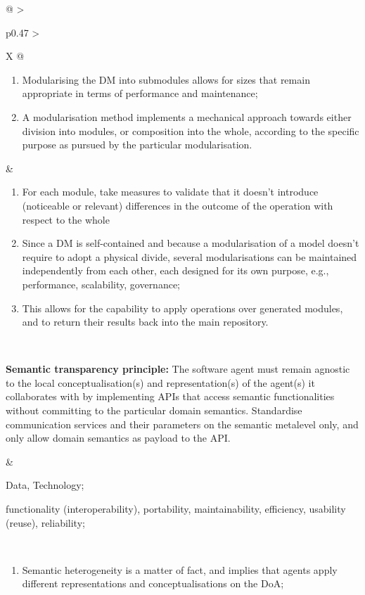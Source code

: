 \begin{xltabular}[l]{\linewidth}{@{} >{\small\raggedright\arraybackslash}p{0.47\linewidth} >{\small\raggedright\arraybackslash}X @{}}
\begin{enumerate}[left=6pt, nosep]
  \item Modularising the DM into submodules allows for sizes that remain appropriate in terms of performance and maintenance;
  \item A modularisation method implements a mechanical approach towards either division into modules, or composition into the whole, according to the specific purpose as pursued by the particular modularisation.
\end{enumerate}
&
\begin{enumerate}[left=10pt, nosep]
  \item For each module, take measures to validate that it doesn't introduce (noticeable or relevant) differences in the outcome of the operation with respect to the whole
  \item Since a DM is self-contained and because a modularisation of a model doesn't require to adopt a physical divide, several modularisations can be maintained independently from each other, each designed for its own purpose, e.g., performance, scalability, governance;
  \item This allows for the capability to apply operations over generated modules, and to return their results back into the main repository.
\end{enumerate} \\
%
%
%
\begin{mmdp}\label{dp:stp}{\bfseries Semantic transparency principle:}
\quad The software agent must remain agnostic to the local conceptualisation(s) and representation(s) of the agent(s) it collaborates with by implementing APIs that access semantic functionalities without committing to the particular domain semantics. Standardise communication services and their parameters on the semantic metalevel only, and only allow domain semantics as payload to the API.\end{mmdp}
&
\begin{description}[labelwidth=3.7cm,leftmargin=3.7cm+1ex,nosep,topsep=2ex,labelsep=1ex,font=\bfseries]
\item[Type of information:] Data, Technology;
\item[Quality attributes:] functionality (interoperability), portability, maintainability, efficiency, usability (reuse), reliability;
\end{description}
\\
\begin{enumerate}[left=6pt, nosep]
  \item Semantic heterogeneity is a matter of fact, and implies that agents apply different representations and conceptualisations on the DoA;

\end{enumerate}
\end{xltabular}
